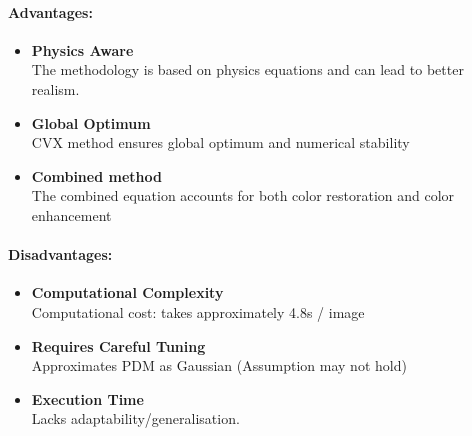 \paragraph{Advantages:}
\begin{itemize}
      \item \textbf{Physics Aware} \\
            The methodology is based on physics equations and can lead to better realism.

      \item \textbf{Global Optimum} \\
            CVX method ensures global optimum and numerical stability

      \item \textbf{Combined method} \\
            The combined equation accounts for both color restoration and color enhancement
\end{itemize}

\paragraph{Disadvantages:}

\begin{itemize}
      \item \textbf{Computational Complexity} \\
            Computational cost: takes approximately 4.8s / image

      \item \textbf{Requires Careful Tuning} \\
            Approximates PDM as Gaussian (Assumption may not hold)

      \item \textbf{Execution Time} \\
            Lacks adaptability/generalisation.
\end{itemize}